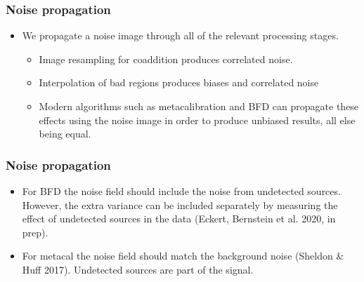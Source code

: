 \documentclass{beamer}
\begin{document}
\frame
{

    \frametitle{Noise propagation}

    \begin{itemize}

        \item We propagate a noise image through all of the relevant processing
            stages.

        \begin{itemize}

            \item Image resampling for coaddition produces correlated noise.

            \item Interpolation of bad regions produces biases and correlated
                noise

            \item Modern algorithms such as metacalibration and BFD can
                propagate these effects using the noise image in order to
                produce unbiased results, all else being equal.

        \end{itemize}


    \end{itemize}

}

\frame
{

    \frametitle{Noise propagation}

    \begin{itemize}

        \item For BFD the noise field should include the noise from undetected
            sources.  However, the extra variance can be included separately by
            measuring the effect of undetected sources in the data (Eckert, Bernstein et
            al. 2020, in prep).

        \item For metacal the noise field should match the background noise (Sheldon \& Huff 2017).
            Undetected sources are part of the signal.
            

    \end{itemize}

}
\end{document}

